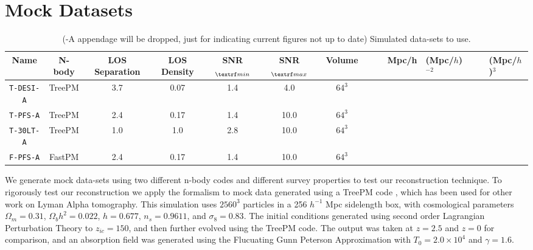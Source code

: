 \documentclass[usenatbib,onecolumn]{mnras}
\begin{document}
\section{Mock Datasets}
\label{sec:mocks}
\begin{table}
  \begin{center}
    \label{tab:table1}
    \begin{tabular}{c|c|c|c|c|c|c} %
      \textbf{Name} & \textbf{N-body} & \textbf{LOS Separation} &\textbf{LOS Density} & \textbf{SNR$_{\textrf min}$} &\textbf{SNR$_{\textrf max}$} & \textbf{Volume} \ \
      &  & & Mpc/h &  (Mpc/$h$)$^{-2}$ & & & (Mpc/$h$)$^3$ \\
      \hline
    \hline
        \texttt{T-DESI-A} & TreePM & 3.7 & 0.07 & 1.4 & 4.0 & $64^3$\\
        \texttt{T-PFS-A} & TreePM & 2.4 & 0.17 & 1.4 & 10.0 & $64^3$ \\
        \texttt{T-30LT-A} & TreePM & 1.0 & 1.0 & 2.8 & 10.0 & $64^3$ \\
        \texttt{F-PFS-A} & FastPM & 2.4 & 0.17 & 1.4 & 10.0 & $64^3$\\
    \end{tabular}
        \caption{ (-A appendage will be dropped, just for indicating current figures not up to date) Simulated data-sets to use.}

  \end{center}
\end{table}

We generate mock data-sets using two different n-body codes and different survey properties to test our reconstruction technique. 
To rigorously test our reconstruction we apply the formalism to mock data generated using a TreePM code \cite{2002White,2010White}, which has been used for other work on Lyman Alpha tomography. \cite{2018Krolewski,2015StarkProtocluster,Stark2015,2015StarkProtocluster} This simulation uses $2560^3$ particles in a 256 $h^{-1}$ Mpc sidelength box, with cosmological parameters $\Omega_m = 0.31$, $\Omega_b h^2 = 0.022$, $h = 0.677$, $n_s = 0.9611$, and $\sigma_8=0.83$. The initial conditions generated using second order Lagrangian Perturbation Theory to $z_{ic}=150$, and then further evolved using the TreePM code. The output was taken at $z=2.5$ and $z=0$ for comparison, and an absorption field was generated using the Flucuating Gunn Peterson Approximation with $T_0 = 2.0 \times 10^4$ and $\gamma=1.6$.
\end{document}
